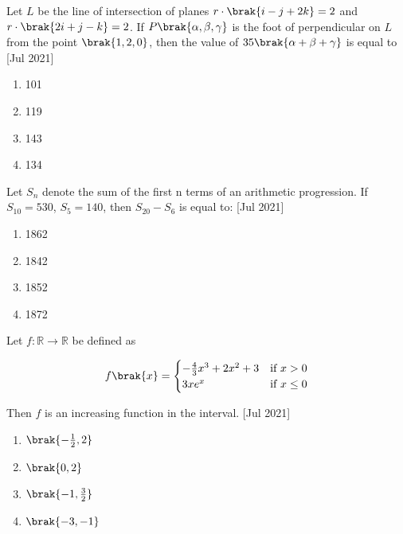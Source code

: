 
   \iffalse
   \title{Assignment}
   \author{ee24btech11059}
   \section{mcq-single}
   \fi
    \item{
          	Let $L$ be the line of intersection of planes $r \cdot \brak{i - j + 2k} = 2$ and $r \cdot \brak{2i + j - k} = 2$. If $P\brak{\alpha, \beta, \gamma}$ is the foot of perpendicular on $L$ from the point $\brak{1, 2, 0}$, then the value of $35\brak{\alpha + \beta + \gamma}$ is equal to \text{  }\hfill
                {[Jul 2021]}
                \begin{multicols}{4}
					\begin{enumerate}
						\item 101
						\item 119
						\item 143
						\item 134
					\end{enumerate}
				\end{multicols}
            }
    \item{
           	Let $S_n$ denote the sum of the first n terms of an arithmetic progression. If $S_{10} = 530$, $S_5 = 140$, then 
           	$S_{20} - S_6$ is equal to:
           	\hfill
           	{[Jul 2021]}
                \begin{multicols}{4}
                	\begin{enumerate}
                		\item 1862
                		\item 1842
                		\item 1852
                		\item 1872
                	\end{enumerate}
                \end{multicols}
        }
\item{
        	
        	Let $f : \mathbb{R} \rightarrow \mathbb{R}$ be defined as
        	
        	\[ f\brak{x} = \begin{cases} 
        		-\frac{4}{3}x^3 + 2x^2 + 3 & \text{if } x > 0 \\
        		3xe^x & \text{if } x \leq 0 
        	\end{cases} \]
        	
        	Then $f$ is an increasing function in the interval.
        	\hfill
        	{[Jul 2021]}
        	\begin{multicols}{4}
        		\begin{enumerate}
        			\item $\brak{-\frac{1}{2}, 2}$
        			\item $\brak{0,2}$
        			\item $\brak{-1,\frac{3}{2}}$
        			\item $\brak{-3,-1}$
        		\end{enumerate}
        	\end{multicols}
        	
        }
